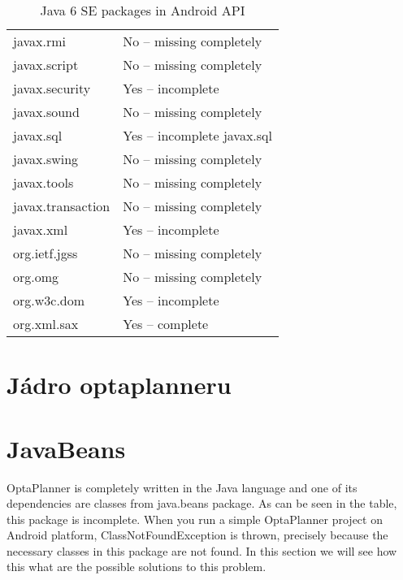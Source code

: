 \begin {table}[h!]
\begin{tabular}{|l|l|}
javax.rmi		        & No -- missing completely    \\
javax.script	        & No -- missing completely    \\
javax.security          & Yes -- incomplete            \\
javax.sound             & No -- missing completely    \\
javax.sql	            & Yes -- incomplete javax.sql  \\
javax.swing	            & No -- missing completely    \\
javax.tools	            & No -- missing completely    \\
javax.transaction	    & No -- missing completely    \\
javax.xml	            & Yes -- incomplete            \\
org.ietf.jgss	        & No -- missing completely    \\
org.omg                 & No -- missing completely    \\
org.w3c.dom             & Yes -- incomplete            \\
org.xml.sax	            & Yes -- complete              \\
\hline
\end{tabular}
\centering
\caption{Java 6 SE packages in Android API}
\label{javaDiff}
\end{table}

\section{Jádro optaplanneru}

\section{JavaBeans}
OptaPlanner is completely written in the Java language and one of its dependencies are classes from java.beans package. As can be seen in the table, this package is incomplete. When you run a simple OptaPlanner project on Android platform, ClassNotFoundException is thrown, precisely because the necessary classes in this package are not found. In this section we will see how this what are the possible solutions to this problem.

